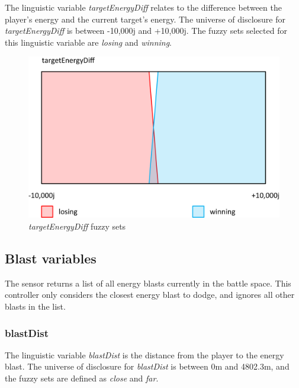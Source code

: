 The linguistic variable \emph{targetEnergyDiff} relates to the difference between the player's energy and the current target's energy. The universe of disclosure for \emph{targetEnergyDiff} is between -10,000j and +10,000j. The fuzzy sets selected for this linguistic variable are \emph{losing} and \emph{winning}.

\begin{figure}[H]
\centering
\caption{\emph{targetEnergyDiff} fuzzy sets}
\includegraphics[scale=0.08]{./img/pdf/targetEnergyDiffSets.pdf}
\end{figure}

\subsection{Blast variables}

The sensor returns a list of all energy blasts currently in the battle space. This controller only considers the closest energy blast to dodge, and ignores all other blasts in the list.

\subsubsection{blastDist}

The linguistic variable \emph{blastDist} is the distance from the player to the energy blast. The universe of disclosure for \emph{blastDist} is between 0m and 4802.3m, and the fuzzy sets are defined as \emph{close} and \emph{far}.

